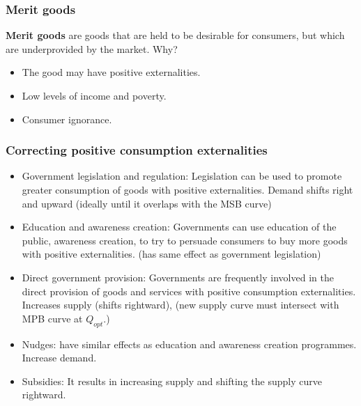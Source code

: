 \documentclass[a4paper,12pt]{article}
\newcommand{\needbold}[1]{\textcolor{red!70!black}{\textbf{#1}}}
\begin{document}
\subsubsection*{Merit goods}
\needbold{Merit goods} are goods that are held to be desirable for consumers, but which are underprovided by the market. Why?
\begin{itemize}
  \item The good may have positive externalities.
  \item Low levels of income and poverty. 
  \item Consumer ignorance.
\end{itemize}
\subsubsection*{Correcting positive consumption externalities}
\begin{itemize}
  \item Government legislation and regulation: Legislation can be used to promote greater consumption of goods with positive externalities. Demand shifts right and upward (ideally until it overlaps with the MSB curve)
  \item Education and awareness creation: Governments can use education of the public, awareness creation, to try to persuade consumers to buy more goods with positive externalities. (has same effect as government legislation)
  \item Direct government provision: Governments are frequently involved in the direct provision of goods and services with positive consumption externalities. Increases supply (shifts rightward), (new supply curve must intersect with MPB curve at $Q_{opt}$.)
  \item Nudges: have similar effects as education and awareness creation programmes. Increase demand.
  \item Subsidies: It results in increasing supply and shifting the supply curve rightward.
\end{itemize}
\end{document}
